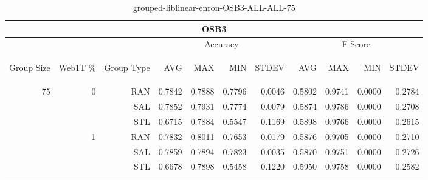 \begin{center}
\begin{table}[htbp]
\begin{tabular}{ | r | r | r | r | r | r | r | r | r | r | r |}
\hline
\multicolumn{11}{|c|}{OSB3}\\
\hline
 & & & \multicolumn{4}{|c|}{Accuracy} & \multicolumn{4}{|c|}{F-Score}\\ \cline{4-11}
\begin{sideways}Group Size\end{sideways} & \begin{sideways}Web1T \%\end{sideways} & \begin{sideways}Group Type\end{sideways} & \begin{sideways}AVG\end{sideways} & \begin{sideways}MAX\end{sideways} & \begin{sideways}MIN\end{sideways} & \begin{sideways}STDEV\end{sideways} & \begin{sideways}AVG\end{sideways} & \begin{sideways}MAX\end{sideways} & \begin{sideways}MIN\end{sideways} & \begin{sideways}STDEV\end{sideways}\\
\hline
\multirow{6}{*}{75}
 & \multirow{3}{*}{0} & RAN & 0.7842 & 0.7888 & 0.7796 & 0.0046 & 0.5802 & 0.9741 & 0.0000 & 0.2784\\ \cline{3-11}
 &   & SAL & 0.7852 & 0.7931 & 0.7774 & 0.0079 & 0.5874 & 0.9786 & 0.0000 & 0.2708\\ \cline{3-11}
 &   & STL & 0.6715 & 0.7884 & 0.5547 & 0.1169 & 0.5898 & 0.9766 & 0.0000 & 0.2615\\ \cline{2-11}
 & \multirow{3}{*}{1} & RAN & 0.7832 & 0.8011 & 0.7653 & 0.0179 & 0.5876 & 0.9705 & 0.0000 & 0.2710\\ \cline{3-11}
 &   & SAL & 0.7859 & 0.7894 & 0.7823 & 0.0035 & 0.5870 & 0.9751 & 0.0000 & 0.2726\\ \cline{3-11}
 &   & STL & 0.6678 & 0.7898 & 0.5458 & 0.1220 & 0.5950 & 0.9758 & 0.0000 & 0.2582\\ \cline{2-11}
\hline
\end{tabular}
\caption{grouped-liblinear-enron-OSB3-ALL-ALL-75}
\end{table}
\end{center}

